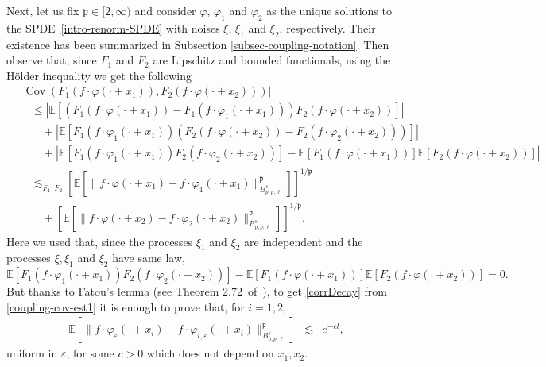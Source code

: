 \documentclass{article}
\newcommand{\tmop}[1]{\ensuremath{\operatorname{#1}}}
\begin{document}
Next, let us fix $\mathfrak{p} \in [2, \infty)$ and consider $\varphi$, $\varphi_1$ and $\varphi_2$ as the unique solutions to the SPDE~\eqref{intro-renorm-SPDE} with noises $\xi$, $\xi_1$ and $\xi_2$, respectively. Their existence has been summarized in Subsection \ref{subsec-coupling-notation}.  Then observe that,  since $F_1$ and $F_2$ are Lipschitz and bounded functionals, using the H{\"o}lder inequality we get the following
%
\begin{align}\label{coupling-cov-est1}
    & | \tmop{Cov} (F_1 (f \cdot \varphi (\cdot + x_1)), F_2 (f \cdot \varphi
    (\cdot + x_2))) | \nonumber\\
    & \quad \leq  | \mathbb{E} [(F_1 (f \cdot \varphi (\cdot + x_1)) - F_1 (f
    \cdot \varphi_1 (\cdot + x_1))) F_2 (f \cdot \varphi (\cdot + x_2))] | \nonumber\\
    & \quad \quad + | \mathbb{E} [F_1 (f \cdot \varphi_1 (\cdot + x_1))  (F_2 (f \cdot
    \varphi (\cdot + x_2)) - F_2 (f \cdot \varphi_2 (\cdot + x_2)))] | \nonumber\\
    & \quad \quad + | \mathbb{E} [F_1 (f \cdot \varphi_1 (\cdot + x_1)) F_2 (f \cdot
    \varphi_2 (\cdot + x_2))] -\mathbb{E} [F_1 (f \cdot \varphi (\cdot +
    x_1))] \mathbb{E} [F_2 (f \cdot \varphi (\cdot + x_2))] | \nonumber\\
    & \quad \lesssim_{F_1, F_2}   [\mathbb{E} [\| f \cdot \varphi (\cdot + x_1) - f
    \cdot \varphi_1 (\cdot + x_1) \|_{B_{p, p, \ell}^s}^{\mathfrak{p}}]]^{1
    /\mathfrak{p}}  \nonumber\\
    & \quad \quad + [\mathbb{E} [\| f \cdot \varphi (\cdot + x_2) - f \cdot
    \varphi_2 (\cdot + x_2) \|_{B_{p, p, \ell}^s}^{\mathfrak{p}}]]^{1
    /\mathfrak{p}}.  
\end{align}
%
Here we used that, since the processes $\xi_1$ and $\xi_2$ are independent and the processes $\xi,\xi_1$ and $\xi_2$ have same law, 
%
\[ \mathbb{E} [F_1 (f \cdot \varphi_1 (\cdot + x_1)) F_2 (f \cdot \varphi_2
   (\cdot + x_2))] -\mathbb{E} [F_1 (f \cdot \varphi (\cdot + x_1))]
   \mathbb{E} [F_2 (f \cdot \varphi (\cdot + x_2))] = 0. \]
But thanks to Fatou's lemma (see Theorem 2.72~of~{\cite{BahouriEtAl2011}}), to
get \eqref{corrDecay} from \eqref{coupling-cov-est1} it is enough to prove
that, for $i = 1, 2$,
\begin{equation}
  \begin{array}{lll}
    \mathbb{E} [\| f \cdot \varphi_{\varepsilon} (\cdot + x_i) - f \cdot
    \varphi_{i, \varepsilon} (\cdot + x_i) \|_{B_{p, p,
    \ell}^s}^{\mathfrak{p}}] & \lesssim  & e^{- c l},
  \end{array} \label{formal-decay}
\end{equation}
uniform in $\varepsilon$, for some $c > 0$ which does not depend on $x_1,
x_2$.
\end{document}
